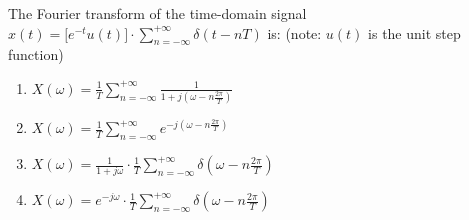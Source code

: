 \begin{q}{}
The Fourier transform of the time-domain signal $\displaystyle x(t) = \bigg[ e^{-t} u(t) \bigg] \cdot \sum_{n=-\infty}^{+\infty} \delta(t-nT)$ is: (note: $u(t)$ is the unit step function) 

\begin{enumerate}[label=(\alph*)]
    \item $X(\omega) = \frac{1}{T} \sum_{n=-\infty}^{+\infty} \frac{1}{1+j(\omega - n \frac{2\pi}{T})}$
    \item $X(\omega) = \frac{1}{T} \sum_{n=-\infty}^{+\infty} e^{-j(\omega - n \frac{2\pi}{T})}$
    \item $X(\omega) = \frac{1}{1+j\omega} \cdot \frac{1}{T} \sum_{n=-\infty}^{+\infty} \delta(\omega - n \frac{2\pi}{T})$
    \item $X(\omega) = e^{-j\omega} \cdot \frac{1}{T} \sum_{n=-\infty}^{+\infty} \delta(\omega - n \frac{2\pi}{T})$
\end{enumerate}
\end{q}